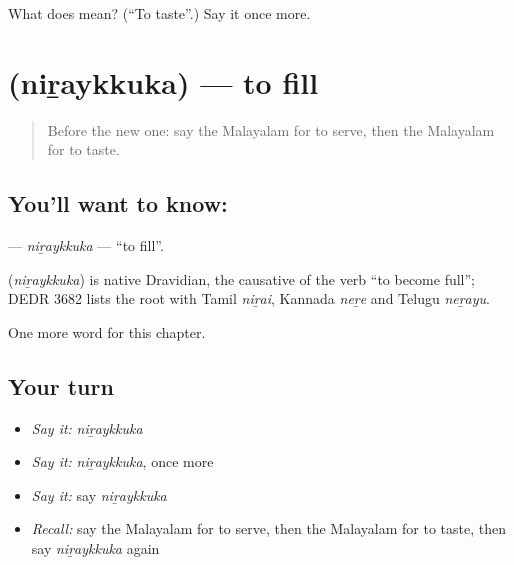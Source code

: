 \begin{tcolorbox}[breakable,colback=teal!4,colframe=teal!35!black,title={Before you move on}]
What does  mean? (\textquotedblleft{}To taste\textquotedblright{}.) Say it once more.
\end{tcolorbox}
\section[\texorpdfstring{\ml{നിറയ്ക്കുക} (niṟaykkuka)}{നിറയ്ക്കുക (niṟaykkuka)}]{ (niṟaykkuka) — to fill}

\label{lesson:ML-C224-niraykkuka}



\begin{quote}
Before the new one: say the Malayalam for to serve, then the Malayalam for to taste.
\end{quote}

\subsection*{You'll want to know: }
\textbf{} — \emph{niṟaykkuka} — \textquotedblleft{}to fill\textquotedblright{}.

\begin{cousinweb}
\textbf{} (\emph{niṟaykkuka}) is native Dravidian, the causative of the verb \textquotedblleft{}to become full\textquotedblright{}; DEDR 3682 lists the root with Tamil \emph{niṟai}, Kannada \emph{neṟe} and Telugu \emph{neṟayu}.
\end{cousinweb}

\begin{grammarlens}[title={What you've built}]
One more word for this chapter.
\end{grammarlens}

\subsection*{Your turn}
\begin{itemize}
\raggedright
  \item \emph{Say it:} \emph{niṟaykkuka}
  \item \emph{Say it:} \emph{niṟaykkuka}, once more
  \item \emph{Say it:} say \emph{niṟaykkuka}
  \item \emph{Recall:} say the Malayalam for to serve, then the Malayalam for to taste, then say \emph{niṟaykkuka} again
\end{itemize}


